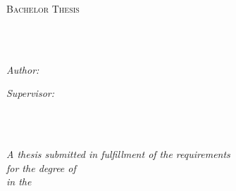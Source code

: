 \documentclass[
    11pt, %
    oneside, %
    ukrainian,
    english, %
    singlespacing, %
    headsepline, %
]{BachelorMasterThesis} %
\author{Ivan \textsc{Shevchenko}} %
\begin{document}
\frontmatter %

\pagestyle{plain} %


\begin{titlepage}
\begin{center}

\vspace*{.06\textheight}
{\scshape\LARGE \univname\par}\vspace{1.5cm} %
\textsc{\Large Bachelor Thesis}\\[0.5cm] %

\HRule \\[0.4cm] %
{\huge \bfseries \ttitle\par}\vspace{0.4cm} %
\HRule \\[1.5cm] %
 
\begin{minipage}[t]{0.4\textwidth}
\begin{flushleft} \large
\emph{Author:}\\
\href{https://www.linkedin.com/in/ishevche/}{\authorname} %
\end{flushleft}
\end{minipage}
\begin{minipage}[t]{0.4\textwidth}
\begin{flushright} \large
\emph{Supervisor:} \\
\href{https://www.informatik.uni-wuerzburg.de/algo/team/wolff-alexander/}{\supnameone} \\ %
\href{https://yutookada.com/en/}{\supnametwo} %
\end{flushright}
\end{minipage}\\[3cm]

\vfill

\large \textit{A thesis submitted in fulfillment of the requirements\\ for the degree of \degreename}\\[0.3cm] %
\textit{in the}\\[0.4cm]
\groupname\\\deptname\\[2cm] %
 

\end{center}
\end{titlepage}
\end{document}
